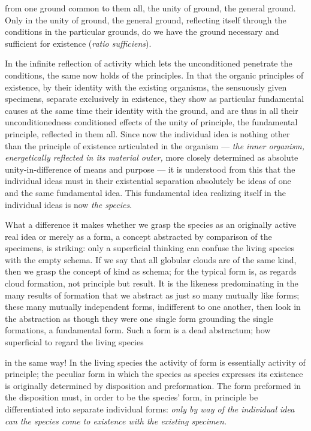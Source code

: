\documentclass[12pt,a4paper]{book}
\begin{document}
from one ground common to them all, the unity of ground, the general ground. Only
in the unity of ground, the general ground, reflecting itself through the
conditions in the particular grounds, do we have the ground necessary and
sufficient for existence (\textit{ratio sufficiens}).

In the infinite reflection of activity which lets the unconditioned penetrate the
conditions, the same now holds of the principles. In that the organic principles
of existence, by their identity with the existing organisms, the sensuously given
specimens, separate exclusively in existence, they show as particular fundamental
causes at the same time their identity with the ground, and are thus in all their
unconditionedness conditioned effects of the unity of principle, the fundamental
principle, reflected in them all. Since now the individual idea is nothing other
than the principle of existence articulated in the organism --- \emph{the inner
organism, energetically reflected in its material outer,} more closely determined
as absolute unity-in-difference of means and purpose --- it is understood from this
that the individual ideas must in their existential separation absolutely be ideas
of one and the same fundamental idea. This fundamental idea realizing itself in the
individual ideas is now \emph{the species}.

What a difference it makes whether we grasp the species as an originally active
real idea or merely as a form, a concept abstracted by comparison of the specimens,
is striking: only a superficial thinking can confuse the living species with the
empty schema. If we say that all globular clouds are of the same kind, then we
grasp the concept of kind as schema; for the typical form is, as regards cloud
formation, not principle but result. It is the likeness predominating in the many
results of formation that we abstract as just so many mutually like forms; these
many mutually independent forms, indifferent to one another, then look in the
abstraction as though they were one single form grounding the single formations, a
fundamental form. Such a form is a dead abstractum; how superficial to regard the
living species

\setcounter{footnote}{0}
in the same way! In the living species the activity of form is essentially activity
of principle; the peculiar form in which the species as species expresses its
existence is originally determined by disposition and preformation. The form
preformed in the disposition must, in order to be the species' form, in principle
be differentiated into separate individual forms: \emph{only by way of the
individual idea can the species come to existence with the existing specimen.}
\end{document}
